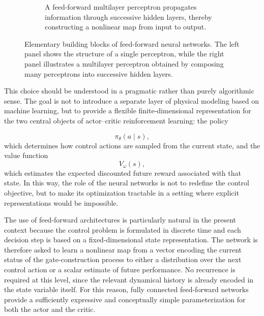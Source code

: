 \begin{figure}[t]
\begin{subfigure}[t]{0.56\textwidth}
\caption{A feed-forward multilayer perceptron propagates information through successive hidden layers, thereby constructing a nonlinear map from input to output.}
\label{fig:feedforward_mlp}
\end{subfigure}

\caption{Elementary building blocks of feed-forward neural networks. The left panel shows the structure of a single perceptron, while the right panel illustrates a multilayer perceptron obtained by composing many perceptrons into successive hidden layers.}
\label{fig:perceptron_and_mlp}
\end{figure}

This choice should be understood in a pragmatic rather than purely algorithmic sense. The goal is not to introduce a separate layer of physical modeling based on machine learning, but to provide a flexible finite-dimensional representation for the two central objects of actor--critic reinforcement learning: the policy

\begin{equation}
\pi_{\theta}(a \mid s),
\label{eq:nn_policy_general}
\end{equation}
which determines how control actions are sampled from the current state, and the value function
\begin{equation}
V_{\omega}(s),
\label{eq:nn_value_general}
\end{equation}
which estimates the expected discounted future reward associated with that state. In this way, the role of the neural networks is not to redefine the control objective, but to make its optimization tractable in a setting where explicit representations would be impossible.

The use of feed-forward architectures is particularly natural in the present context because the control problem is formulated in discrete time and each decision step is based on a fixed-dimensional state representation. The network is therefore asked to learn a nonlinear map from a vector encoding the current status of the gate-construction process to either a distribution over the next control action or a scalar estimate of future performance. No recurrence is required at this level, since the relevant dynamical history is already encoded in the state variable itself. For this reason, fully connected feed-forward networks provide a sufficiently expressive and conceptually simple parameterization for both the actor and the critic.

